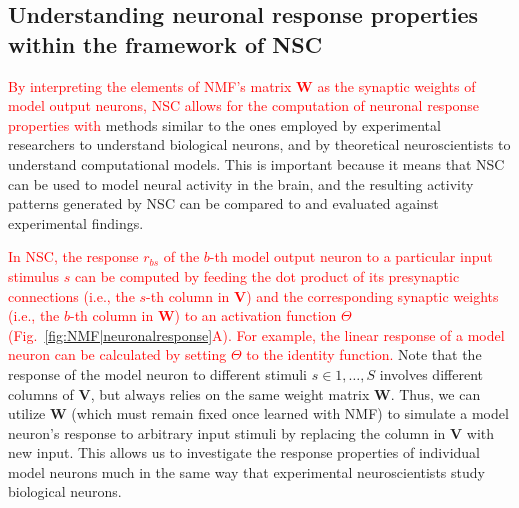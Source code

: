 \subsection{Understanding neuronal response properties within the framework of NSC}

\textcolor{red}{By interpreting the elements of \ac{NMF}'s
matrix \textbf{W} as the synaptic weights of model output neurons,
\ac{NSC} allows for the computation of neuronal response properties
with}
methods similar to the ones employed by experimental researchers to understand biological neurons,
and by theoretical neuroscientists to understand computational models. This is important because it means that NSC can be used to model neural activity in the brain, and the resulting activity patterns generated by NSC can be compared to and evaluated against experimental findings. 

\textcolor{red}{In \ac{NSC}, the response $r_{bs}$ of
the $b$-th model output neuron to a particular input stimulus $s$
can be computed by feeding the dot product of its presynaptic connections
(i.e., the $s$-th column in \textbf{V})
and the corresponding synaptic weights
(i.e., the $b$-th column in $\mathbf{W}$)
to an activation function $\Theta$
(Fig.~\ref{fig:NMF|neuronalresponse}A).}
%
\textcolor{red}{For example, the linear response of a model neuron
can be calculated by setting $\Theta$ to the identity function.}
Note that the response of the model neuron to different stimuli 
$s \in 1, \ldots, S$
involves different columns of \textbf{V},
but always relies on the same weight matrix \textbf{W}.
Thus, we can utilize \textbf{W}
(which must remain fixed once learned with \ac{NMF})
to simulate a model neuron's response to arbitrary input stimuli
by replacing the column in \textbf{V} with new input.
This allows us to investigate the response properties of individual model neurons
much in the same way that experimental neuroscientists study biological neurons.

